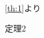 \documentclass[../../../main.tex]{subfiles} %
\begin{document}
\autoref{th:1}より
\begin{theorem}\label{th:2}
    定理2
\end{theorem}
\end{document}
